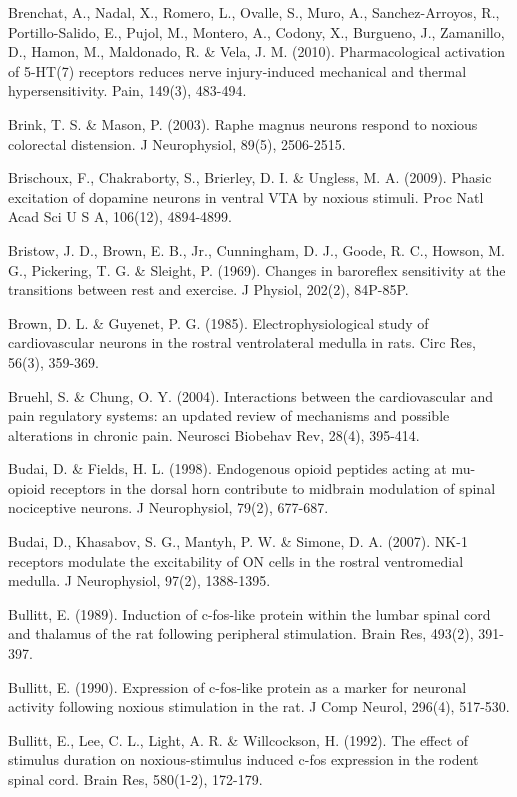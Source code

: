 \documentclass[a4paper,12pt,twoside]{report}
\begin{document}
\begin{singlespacing}
\begin{footnotesize}
Brenchat, A., Nadal, X., Romero, L., Ovalle, S., Muro, A., Sanchez-Arroyos, R., Portillo-Salido, E., Pujol, M., Montero, A., Codony, X., Burgueno, J., Zamanillo, D., Hamon, M., Maldonado, R. \& Vela, J. M. (2010). Pharmacological activation of 5-HT(7) receptors reduces nerve injury-induced mechanical and thermal hypersensitivity. Pain, 149(3), 483-494.

Brink, T. S. \& Mason, P. (2003). Raphe magnus neurons respond to noxious colorectal distension. J Neurophysiol, 89(5), 2506-2515.

Brischoux, F., Chakraborty, S., Brierley, D. I. \& Ungless, M. A. (2009). Phasic excitation of dopamine neurons in ventral VTA by noxious stimuli. Proc Natl Acad Sci U S A, 106(12), 4894-4899.

Bristow, J. D., Brown, E. B., Jr., Cunningham, D. J., Goode, R. C., Howson, M. G., Pickering, T. G. \& Sleight, P. (1969). Changes in baroreflex sensitivity at the transitions between rest and exercise. J Physiol, 202(2), 84P-85P.

Brown, D. L. \& Guyenet, P. G. (1985). Electrophysiological study of cardiovascular neurons in the rostral ventrolateral medulla in rats. Circ Res, 56(3), 359-369.

Bruehl, S. \& Chung, O. Y. (2004). Interactions between the cardiovascular and pain regulatory systems: an updated review of mechanisms and possible alterations in chronic pain. Neurosci Biobehav Rev, 28(4), 395-414.

Budai, D. \& Fields, H. L. (1998). Endogenous opioid peptides acting at mu-opioid receptors in the dorsal horn contribute to midbrain modulation of spinal nociceptive neurons. J Neurophysiol, 79(2), 677-687.

Budai, D., Khasabov, S. G., Mantyh, P. W. \& Simone, D. A. (2007). NK-1 receptors modulate the excitability of ON cells in the rostral ventromedial medulla. J Neurophysiol, 97(2), 1388-1395.

Bullitt, E. (1989). Induction of c-fos-like protein within the lumbar spinal cord and thalamus of the rat following peripheral stimulation. Brain Res, 493(2), 391-397.

Bullitt, E. (1990). Expression of c-fos-like protein as a marker for neuronal activity following noxious stimulation in the rat. J Comp Neurol, 296(4), 517-530.

Bullitt, E., Lee, C. L., Light, A. R. \& Willcockson, H. (1992). The effect of stimulus duration on noxious-\linebreak stimulus induced c-fos expression in the rodent spinal cord. Brain Res, 580(1-2), 172-179.


\end{footnotesize}
\end{singlespacing}
\end{document}
